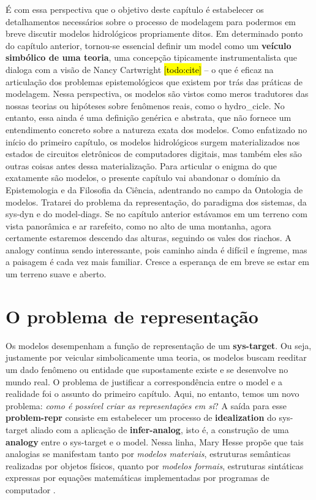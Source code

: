 \documentclass[./main.tex]{subfiles}
\begin{document}
\par É com essa perspectiva que o objetivo deste capítulo é estabelecer os detalhamentos necessários sobre o processo de modelagem para podermos em breve discutir modelos hidrológicos propriamente ditos. Em determinado ponto do capítulo anterior, tornou-se essencial definir um \gls{model} como um \textbf{veículo simbólico de uma teoria}, uma concepção tipicamente instrumentalista que dialoga com a visão de Nancy Cartwright \hl{[todo:cite]} -- o que é eficaz na articulação dos problemas epistemológicos que existem por trás das práticas de modelagem. Nessa perspectiva, os modelos são vistos como meros tradutores das nossas teorias ou hipóteses sobre fenômenos reais, como o \gls{hydro_cicle}. No entanto, essa ainda é uma definição genérica e abstrata, que não fornece um entendimento concreto sobre a natureza exata dos modelos. Como enfatizado no início do primeiro capítulo, os modelos hidrológicos surgem materializados nos estados de circuitos eletrônicos de computadores digitais, mas também eles são outras coisas antes dessa materialização. Para articular o enigma do que exatamente são modelos, o presente capítulo vai abandonar o domínio da Epistemologia e da Filosofia da Ciência, adentrando no campo da Ontologia de modelos. Tratarei do problema da representação, do \gls{paradigma} dos sistemas, da \gls{sys-dyn} e do \gls{model-diags}. Se no capítulo anterior estávamos em um terreno com vista panorâmica e ar rarefeito, como no alto de uma montanha, agora certamente estaremos descendo das alturas, seguindo os vales dos riachos. A \gls{analogy} continua sendo interessante, pois caminho ainda é difícil e íngreme, mas a paisagem é cada vez mais familiar. Cresce a esperança de em breve se estar em um terreno suave e aberto.

\section{O problema de representação} \label{sec:sys:represent}

\par Os modelos desempenham a função de representação de um \textbf{\gls{sys-target}}. Ou seja, justamente por veicular simbolicamente uma \gls{teoria}, os modelos buscam reeditar um dado fenômeno ou entidade que supostamente existe e se desenvolve no mundo real. O problema de justificar a correspondência entre o \gls{model} e a realidade foi o assunto do primeiro capítulo. Aqui, no entanto, temos um novo problema: \textit{como é possível criar as representações em si}? A saída para esse \textbf{\gls{problem-repr}} consiste em estabelecer um processo de \textbf{\gls{idealization}} do \gls{sys-target} aliado com a aplicação de \textbf{\gls{infer-analog}}, isto é, a construção de uma \textbf{\gls{analogy}} entre o \gls{sys-target} e o \gls{model}. Nessa linha, Mary Hesse propõe que tais analogias se manifestam tanto por \textit{modelos materiais}, estruturas semânticas realizadas por objetos físicos, quanto por \textit{modelos formais}, estruturas sintáticas expressas por equações matemáticas implementadas por programas de computador \cite{hesse2017}.
\end{document}
